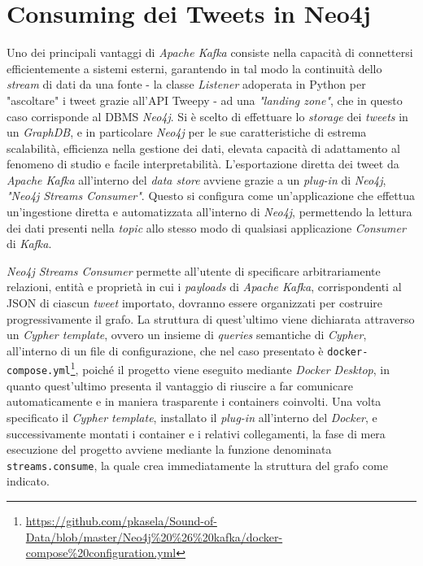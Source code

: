 \documentclass[12pt, a4paper, twocolumn]{article} %
\begin{document}
\section{Consuming dei Tweets in Neo4j}
Uno dei principali vantaggi di \textit{Apache Kafka} consiste nella capacità di connettersi efficientemente a sistemi esterni, garantendo in tal modo la continuità dello \textit{stream} di dati da una fonte - la classe \textit{Listener} adoperata in Python per "ascoltare" i tweet grazie all'API Tweepy - ad una \textit{"landing zone"}, che in questo caso corrisponde al DBMS \textit{Neo4j}. 
Si è scelto di effettuare lo \textit{storage} dei \textit{tweets} in un \textit{GraphDB}, e in particolare \textit{Neo4j} per le sue caratteristiche di estrema scalabilità, efficienza nella gestione dei dati, elevata capacità di adattamento al fenomeno di studio e facile interpretabilità.
L'esportazione diretta dei tweet da \textit{Apache Kafka} all'interno del \textit{data store} avviene grazie a un \textit{plug-in} di \textit{Neo4j}, \textit{"Neo4j Streams Consumer"}.
Questo si configura come un'applicazione che effettua un'ingestione diretta e automatizzata all'interno di \textit{Neo4j}, permettendo la lettura dei dati presenti nella \textit{topic} allo stesso modo di qualsiasi applicazione \textit{Consumer} di \textit{Kafka}.

\textit{Neo4j Streams Consumer} permette all'utente di specificare arbitrariamente relazioni, entità e proprietà in cui i \textit{payloads} di \textit{Apache Kafka}, corrispondenti al JSON di ciascun \textit{tweet} importato, dovranno essere organizzati per costruire progressivamente il grafo.
La struttura di quest'ultimo viene dichiarata attraverso un \textit{Cypher template}, ovvero un insieme di \textit{queries} semantiche di \textit{Cypher}, all'interno di un file di configurazione, che nel caso presentato è \verb|docker-compose.yml|\footnote{\url{https://github.com/pkasela/Sound-of-Data/blob/master/Neo4j\%20\%26\%20kafka/docker-compose\%20configuration.yml}}, poiché il progetto viene eseguito mediante \textit{Docker Desktop}, in quanto quest'ultimo presenta il vantaggio di riuscire a far comunicare automaticamente e in maniera trasparente i containers coinvolti. 
Una volta specificato il \textit{Cypher template}, installato il \textit{plug-in} all'interno del \textit{Docker}, e successivamente montati i container e i relativi collegamenti, la fase di mera esecuzione del progetto avviene mediante la funzione denominata \verb|streams.consume|, la quale crea immediatamente la struttura del grafo come indicato.
\end{document}
